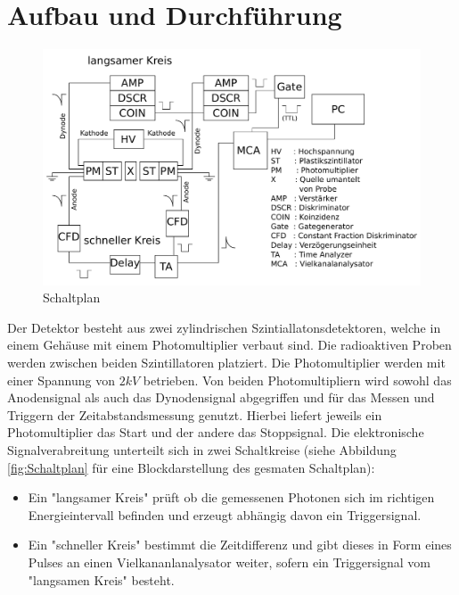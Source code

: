 \documentclass[a4paper,12pt]{article}
\begin{document}
\section{Aufbau und Durchführung}
\begin{figure}[htb]
		\centering
		\includegraphics[width=1.0\textwidth]{../pictures/Schaltplan_custom.pdf}
		\caption{Schaltplan}
		\label{fig:schaltplan}
\end{figure}
Der Detektor besteht aus zwei zylindrischen Szintiallatonsdetektoren,
 welche in einem Gehäuse mit einem Photomultiplier verbaut sind. Die radioaktiven Proben werden zwischen beiden Szintillatoren
platziert. Die Photomultiplier werden mit einer Spannung von $2\si{kV}$ betrieben. Von beiden Photomultipliern
wird sowohl das Anodensignal als auch das Dynodensignal abgegriffen und für das Messen und Triggern der 
Zeitabstandsmessung genutzt. Hierbei liefert jeweils ein Photomultiplier das Start und der andere 
das Stoppsignal.
Die elektronische Signalverabreitung unterteilt sich in zwei Schaltkreise
 (siehe Abbildung \ref{fig:Schaltplan} für eine Blockdarstellung des gesmaten Schaltplan): \\
\begin{itemize}
	\item
	Ein "langsamer Kreis" prüft ob die gemessenen Photonen sich im richtigen Energieintervall 
	befinden und erzeugt abhängig davon ein Triggersignal.
	\item Ein "schneller Kreis" bestimmt die Zeitdifferenz und gibt dieses in Form eines Pulses an einen
	Vielkananlanalysator weiter, sofern ein Triggersignal vom "langsamen Kreis" besteht.	
\end{itemize}
\end{document}
